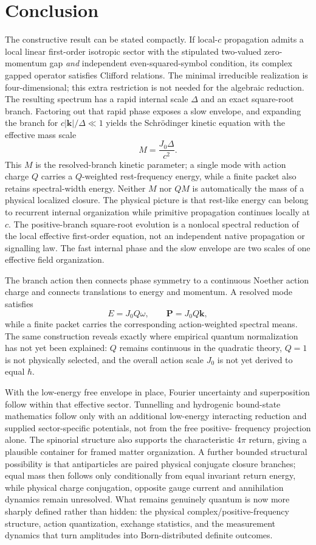 \documentclass[11pt]{article}
\theoremstyle{definition}
\begin{document}
\section{Conclusion}

The constructive result can be stated compactly.  If local-$c$ propagation admits a local
linear first-order isotropic sector with the stipulated two-valued zero-momentum gap
\emph{and} independent even-squared-symbol condition, its complex gapped operator satisfies Clifford relations. The minimal
irreducible realization is four-dimensional; this extra restriction is not
needed for the algebraic reduction.  The resulting spectrum has a rapid internal scale $\Delta$ and an exact square-root
branch.  Factoring out that rapid phase exposes a slow envelope, and expanding the branch for
$c|\mathbf k|/\Delta\ll1$ yields the Schrödinger kinetic equation with the effective mass scale
\[
 M=\frac{J_0\Delta}{c^2}.
\]
This $M$ is the resolved-branch kinetic parameter; a single mode with action
charge $Q$ carries a $Q$-weighted rest-frequency energy, while a finite packet
also retains spectral-width energy.  Neither $M$ nor $QM$ is automatically the
mass of a physical localized closure.  The physical picture is that rest-like
energy can belong to recurrent internal organization while primitive propagation
continues locally at $c$.  The positive-branch square-root evolution is a
nonlocal spectral reduction of the local effective first-order equation, not an
independent native propagation or signalling law.  The fast internal phase and
the slow envelope are two scales of one effective field organization.

The branch action then connects phase symmetry to a continuous Noether action charge and
connects translations to energy and momentum.  A resolved mode satisfies
\[
 E=J_0Q\omega,
 \qquad
 \mathbf P=J_0Q\mathbf k,
\]
while a finite packet carries the corresponding action-weighted spectral means.  The same
construction reveals exactly where empirical quantum normalization has not yet been explained:
$Q$ remains continuous in the quadratic theory, $Q=1$ is not physically selected, and the
overall action scale $J_0$ is not yet derived to equal $\hbar$.

With the low-energy free envelope in place, Fourier uncertainty and
superposition follow within that effective sector.  Tunnelling and hydrogenic
bound-state mathematics follow only with an additional low-energy interacting
reduction and supplied sector-specific potentials, not from the free positive-
frequency projection alone.  The spinorial structure
also supports the characteristic $4\pi$ return, giving a plausible container for framed
matter organization.  A further bounded structural possibility is that antiparticles are
paired physical conjugate closure branches; equal mass then follows only conditionally from
equal invariant return energy, while physical charge conjugation, opposite gauge current and
annihilation dynamics remain unresolved.  What remains genuinely quantum is now more sharply
defined rather than hidden: the physical complex/positive-frequency structure, action
quantization, exchange statistics, and the measurement dynamics that turn amplitudes into
Born-distributed definite outcomes.
\end{document}
